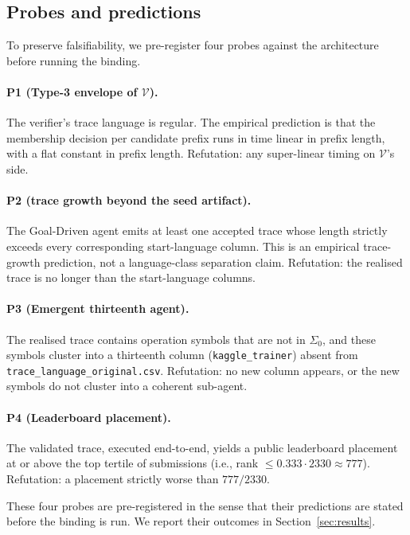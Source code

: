 \subsection{Probes and predictions}

To preserve falsifiability, we pre-register four probes against
the architecture before running the binding.

\paragraph{P1 (Type-3 envelope of $\mathcal{V}$).}
The verifier's trace language is regular.  The empirical
prediction is that the membership decision per candidate prefix
runs in time linear in prefix length, with a flat constant in
prefix length.  Refutation: any super-linear timing on
$\mathcal{V}$'s side.

\paragraph{P2 (trace growth beyond the seed artifact).}
The Goal-Driven agent emits at least one accepted trace whose length
strictly exceeds every corresponding start-language column.  This is
an empirical trace-growth prediction, not a language-class separation
claim.  Refutation: the realised trace is no longer than the
start-language columns.

\paragraph{P3 (Emergent thirteenth agent).}
The realised trace contains operation symbols that are not in
$\Sigma_0$, and these symbols cluster into a thirteenth column
(\texttt{kaggle\_trainer}) absent from
\texttt{trace\_language\_original.csv}.  Refutation: no new
column appears, or the new symbols do not cluster into a coherent
sub-agent.

\paragraph{P4 (Leaderboard placement).}
The validated trace, executed end-to-end, yields a public
leaderboard placement at or above the top tertile of submissions
(i.e., rank $\le 0.333\cdot 2330 \approx 777$).  Refutation: a
placement strictly worse than $777/2330$.

These four probes are pre-registered in the sense that their
predictions are stated before the binding is run.  We report
their outcomes in Section~\ref{sec:results}.

